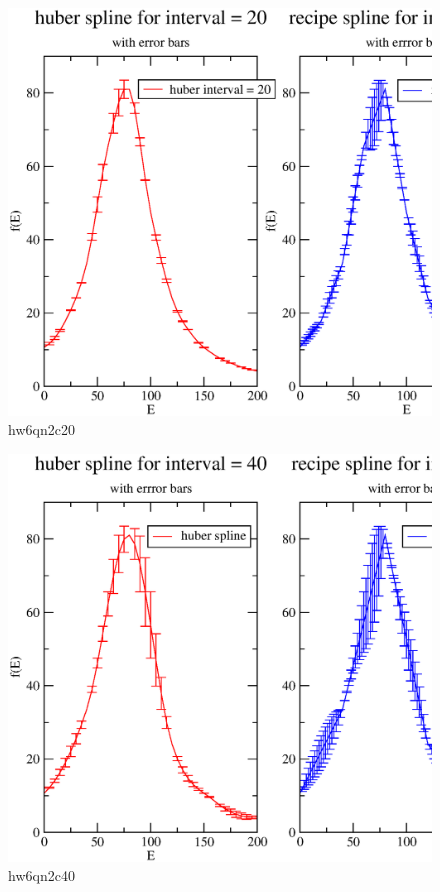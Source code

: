 \documentclass[11pt,a4paper,english]{article}
\begin{document}
	\clearpage
	\begin{figure}[h!]
	\centering
	\includegraphics [scale=0.6]{hw6qn2c20.eps}
	\caption{hw6qn2c20 }
	\end{figure}
	\clearpage
	\begin{figure}[h!]
	\centering
	\includegraphics [scale=0.6]{hw6qn2c40.eps}
	\caption{hw6qn2c40 }
	\end{figure}
	\clearpage
\end{document}
